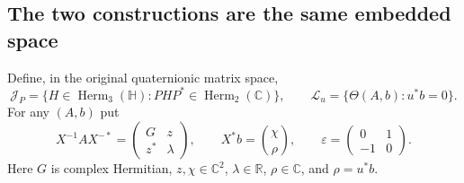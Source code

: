 \subsection{The two constructions are the same embedded space}

Define, in the original quaternionic matrix space,
\[
 \mathcal J_P=\{H\in\operatorname{Herm}_3(\mathbb H):
                       PHP^*\in\operatorname{Herm}_2(\mathbb C)\},
 \qquad
 \mathcal L_u=\{\Theta(A,b):u^*b=0\}.
\]
For any $(A,b)$ put
\begin{equation}\label{q444:full-coordinates}
 X^{-1}AX^{-*}=\begin{pmatrix}G&z\\z^*&\lambda\end{pmatrix},
 \qquad X^*b=\binom{\chi}{\rho},\qquad
 \varepsilon=\begin{pmatrix}0&1\\-1&0\end{pmatrix}.
\end{equation}
Here $G$ is complex Hermitian, $z,\chi\in\mathbb C^2$,
$\lambda\in\mathbb R$, $\rho\in\mathbb C$, and $\rho=u^*b$.

